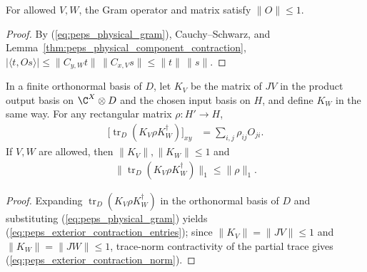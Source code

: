\begin{lemma}
    \label{thm:peps_physical_gram_contraction}
    \leanok
    For allowed $V,W$, the Gram operator and matrix satisfy $\|O\|\leq1$.
\end{lemma}

\begin{proof}\leanok
    By (\ref{eq:peps_physical_gram}), Cauchy--Schwarz, and
    Lemma~\ref{thm:peps_physical_component_contraction},
    $|\langle t,Os\rangle|\leq\|C_{y,W}t\|\,\|C_{x,V}s\|\leq\|t\|\,\|s\|$.
\end{proof}

\begin{lemma}
    \label{thm:peps_exterior_contraction}
    \leanok
    In a finite orthonormal basis of $D$, let $K_V$ be the matrix of $JV$ in
    the product output basis on $\C^X\otimes D$ and the chosen input basis on
    $H$, and define $K_W$ in the same way. For any rectangular matrix
    $\rho:H'\to H$,
    \begin{align}
        \bigl[\operatorname{tr}_{D}(K_V\rho K_W^\dagger)\bigr]_{xy}
         & =\sum_{i,j}\rho_{ij}O_{ji}.
        \label{eq:peps_exterior_contraction_entries}
    \end{align}
    If $V,W$ are allowed, then $\|K_V\|,\|K_W\|\leq1$ and
    \begin{align}
        \|\operatorname{tr}_{D}(K_V\rho K_W^\dagger)\|_1\leq\|\rho\|_1.
        \label{eq:peps_exterior_contraction_norm}
    \end{align}
\end{lemma}

\begin{proof}\leanok
    Expanding $\operatorname{tr}_D(K_V\rho K_W^\dagger)$ in the orthonormal basis
    of $D$ and substituting (\ref{eq:peps_physical_gram}) yields
    (\ref{eq:peps_exterior_contraction_entries}); since $\|K_V\|=\|JV\|\le 1$
    and $\|K_W\|=\|JW\|\le 1$, trace-norm contractivity of the partial trace
    gives (\ref{eq:peps_exterior_contraction_norm}).
\end{proof}

